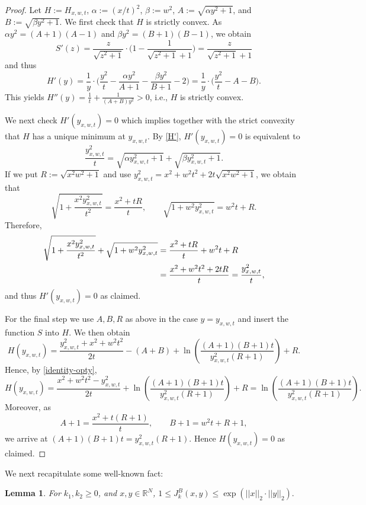\documentclass[reqno]{amsart}
\theoremstyle{plain}
\newtheorem{lemma}[theorem]{Lemma}
\theoremstyle{definition}
\numberwithin{equation}{section}
\newcommand{\R}{\mathbb{R}}
\begin{document}
\begin{proof}
 Let
 $H:=H_{x,w,t}$,  $\alpha:=(x/t)^2$, $\beta:=w^2$,  $A:=\sqrt{\alpha y^2 +1}$, and $B:=\sqrt{\beta y^2 + 1}$.
We first check that $H$ is strictly convex.
As $\alpha y^2 = (A+1) (A-1)$ and $\beta y^2 = (B+1)(B-1)$, we obtain
$$S'(z)=\frac{z}{\sqrt{z^2+1}} \cdot \bigg( 1 - \frac{1}{\sqrt{z^2+1}+1} \bigg)=\frac{z}{\sqrt{z^2+1}+1}$$
and thus
\begin{equation}\label{H'}
    H'(y)=\frac{1}{y} \cdot \bigg( \frac{y^2}{t} - \frac{\alpha y^2}{A+1} - \frac{\beta y^2}{B+1}-2 \bigg)
= \frac{1}{y} \cdot \bigg(\frac{y^2}{t}-A-B\bigg).\end{equation}
This yields $H''(y)=\frac{1}{t} + \frac{1}{(A+B)y^2}>0$, i.e.,  $H$ is strictly convex.


We next check $H'(y_{x,w,t})=0$ which implies together with the strict convexity that $H$ has a unique minimum at $y_{x,w,t}$.
By \eqref{H'},  $H'(y_{x,w,t})=0$ is equivalent to
$$\frac{y_{x,w,t}^2}{t}=\sqrt{\alpha y_{x,w,t}^2 +1}+\sqrt{\beta y_{x,w,t}^2 + 1}.$$
If we put $R:=\sqrt{x^2w^2+1}$ and use
$y_{x,w,t}^2=x^2+w^2t^2+2t\sqrt{x^2w^2+1}$,
we obtain  that
$$\sqrt{1+\frac{x^2y_{x,w,t}^2}{t^2}}=\frac{x^2+tR}{t},
\quad\quad
\sqrt{1+w^2y_{x,w,t}^2}=w^2t+R.$$
Therefore,
\begin{align}\label{identity-opty}
\sqrt{1+\frac{x^2y_{x,w,t}^2}{t^2}}+\sqrt{1+w^2y_{x,w,t}^2}&=
\frac{x^2+tR}{t}
+w^2t+R\notag\\
&=
\frac{x^2+w^2t^2+2tR}{t}
=\frac{y_{x,w,t}^2}{t},
\end{align}
and thus $H'(y_{x,w,t})=0$ as claimed.

For the final step we use $A,B,R$ as above in the case $y=y_{x,w,t}$
and insert the function $S$ into $H$. We then obtain
$$H(y_{x,w,t})=
\frac{y^2_{x,w,t}+x^2+w^2t^2}{2t}-(A+B)
+\ln\!\left(
\frac{(A+1)(B+1)t}
{y^2_{x,w,t}(R+1)}
\right)+R.$$
Hence, by \eqref{identity-opty},
$$H(y_{x,w,t})=
\frac{x^2+w^2t^2-y^2_{x,w,t}}{2t}+
\ln\left(\frac{(A+1)(B+1)t}{y^2_{x,w,t}(R+1)}\right)+R=
\ln\left(\frac{(A+1)(B+1)t}{y^2_{x,w,t}(R+1)}\right) .$$
Moreover, as
$$A+1=\frac{x^2+t(R+1)}{t},
\quad\quad
B+1=w^2t+R+1,$$
we arrive at
$(A+1)(B+1)t=y^2_{x,w,t}(R+1)$.
Hence $H(y_{x,w,t})=0$ as claimed.
\end{proof}

We next recapitulate some well-known fact:

\begin{lemma}\label{Abschaetzung 2 Besselfunktion B}
For $k_1, k_2 \geq 0$, and $x,y \in \R^N$, 
$1 \leq J_k^B(x,y) \leq \exp\left(||x||_2 \cdot ||y||_2\right).$
\end{lemma}
\end{document}
